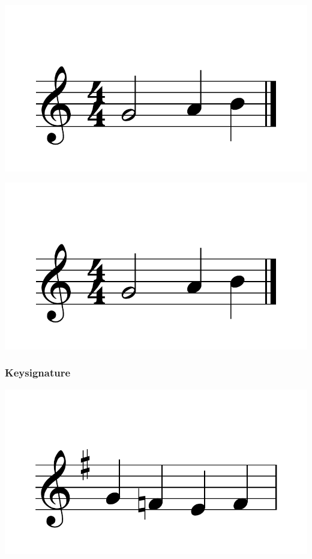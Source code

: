 \documentclass{article}
\begin{document}
\includegraphics[scale=0.5]{figures_tests/pdf/skern/perfectmeter2.pdf}

\includegraphics[scale=0.5]{figures_tests/pdf/skern/perfectmeter3.pdf}

\subsubsection{Keysignature}
\includegraphics[scale=0.5]{figures_tests/pdf/skern/keysignature1.pdf}
\end{document}
